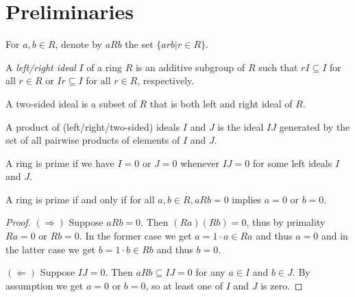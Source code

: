 \section{Preliminaries}
\begin{definition}
  \label{def:aRb}
  \leanok
  For $a, b \in R$, denote by $aRb$ the set $\{arb| r \in R\}$.
\end{definition}

\begin{definition}
  \label{def:left_right_ideal}
  \leanok %
  \uses{} %
  A \textit{left/right ideal} $I$ of a ring $R$ is an additive subgroup of $R$ such that $rI \subseteq I$ for all $r \in R$ or $Ir \subseteq I$ for all $r \in R$, respectively.
\end{definition}

\begin{definition}
  \label{def:two_sided_ideal}
  \leanok
  A two-sided ideal is a subset of $R$ that is both left and right ideal of $R$.
\end{definition}

\begin{definition}
  \label{def:product_of_ideals}
  \leanok
  A product of (left/right/two-sided) ideals $I$ and $J$ is the ideal $IJ$ generated by the set of all pairwise products of elements of $I$ and $J$.
\end{definition}

\begin{definition}
  \label{def:is_prime_ring}
  \leanok
  A ring is prime if we have $I = 0$ or $J = 0$ whenever $IJ = 0$ for some left ideals $I$ and $J$.
\end{definition}

\begin{theorem}
  \label{thm:prime_ring_equiv}
  \leanok
  A ring is prime if and only if for all $a, b \in R, aRb = 0$ implies $a = 0$ or $b = 0$.
\end{theorem}
\begin{proof}
  \leanok
  $(\Rightarrow)$ Suppose $aRb = 0$. Then $(Ra)(Rb) = 0$, thus by primality $Ra = 0$ or $Rb = 0$. In the former case we get $a = 1 \cdot a \in Ra$ and thus $a = 0$ and in the latter case we get $b = 1 \cdot b \in Rb$ and thus $b = 0$.

  $(\Leftarrow)$ Suppose $IJ = 0$. Then $aRb  \subseteq IJ = 0$ for any $a \in I$ and $b \in J$. By assumption we get $a = 0$ or $b = 0$, so at least one of $I$ and $J$ is zero.
\end{proof}

